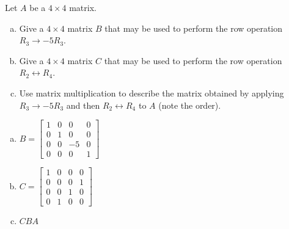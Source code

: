 
\begin{exerciseStatement}


Let \(A\) be a \(4 \times 4\) matrix.


\begin{enumerate}[(a)]
\item Give a \(4 \times 4\) matrix \(B\) that may be used to perform the row operation \( R_3 \to -5R_3 \).
\item Give a \(4 \times 4\) matrix \(C\) that may be used to perform the row operation \( R_2 \leftrightarrow R_4 \).
\item Use matrix multiplication to describe the matrix obtained by applying \( R_3 \to -5R_3 \) and then \( R_2 \leftrightarrow R_4 \) to \(A\) (note the order). 
\end{enumerate}
    
\end{exerciseStatement}
    
\begin{exerciseAnswer} 

\begin{enumerate}[(a)]
\item \(B= \left[\begin{array}{cccc}
1 & 0 & 0 & 0 \\
0 & 1 & 0 & 0 \\
0 & 0 & -5 & 0 \\
0 & 0 & 0 & 1
\end{array}\right] \)
\item \(C= \left[\begin{array}{cccc}
1 & 0 & 0 & 0 \\
0 & 0 & 0 & 1 \\
0 & 0 & 1 & 0 \\
0 & 1 & 0 & 0
\end{array}\right] \)
\item \(CBA\)
\end{enumerate}
    
\end{exerciseAnswer}
    
